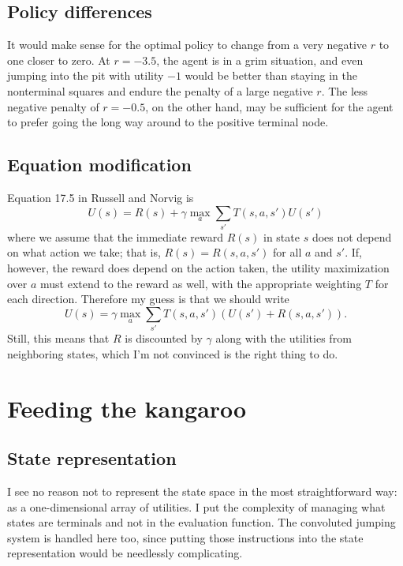 \documentclass[letterpaper, 10pt]{article}
\begin{document}
\begin{multicols*}{2}
\subsection{Policy differences}
It would make sense for the optimal policy to change from a very negative $r$ to one closer to zero.
At $r = -3.5$, the agent is in a grim situation, and even jumping into the pit with utility $-1$ would be better than staying in the nonterminal squares and endure the penalty of a large negative $r$.
The less negative penalty of $r = -0.5$, on the other hand, may be sufficient for the agent to prefer going the long way around to the positive terminal node. 

\subsection{Equation modification}
Equation 17.5 in Russell and Norvig is 
\[ U(s) = R(s) + \gamma \max_a \sum_{s'} T(s, a, s') U(s') \]
where we assume that the immediate reward $R(s)$ in state $s$ does not depend on what action we take; that is, $R(s) = R(s, a, s')$ for all $a$ and $s'$. 
If, however, the reward does depend on the action taken, the utility maximization over $a$ must extend to the reward as well, with the appropriate weighting $T$ for each direction. 
Therefore my guess is that we should write 
\[  U(s) = \gamma \max_a \sum_{s'} T(s, a, s') \left( U(s') + R(s, a, s') \right). \]
Still, this means that $R$ is discounted by $\gamma$ along with the utilities from neighboring states, which I'm not convinced is the right thing to do. 


\section{Feeding the kangaroo}
\subsection{State representation}
I see no reason not to represent the state space in the most straightforward way: as a one-dimensional array of utilities. 
I put the complexity of managing what states are terminals and not in the evaluation function. 
The convoluted jumping system is handled here too, since putting those instructions into the state representation would be needlessly complicating. 


\end{multicols*}
\end{document}
